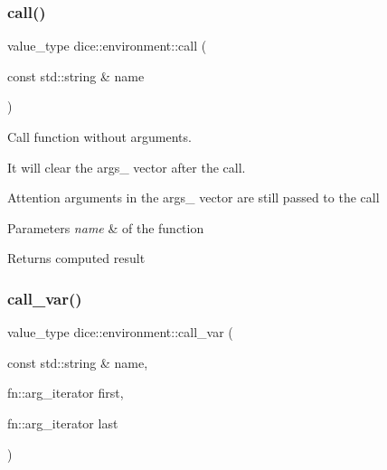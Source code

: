 \subsubsection{\texorpdfstring{call()}{call()}\hspace{0.1cm}{\footnotesize\ttfamily [2/2]}}
{\footnotesize\ttfamily value\+\_\+type dice\+::environment\+::call (\begin{DoxyParamCaption}\item[{const std\+::string \&}]{name }\end{DoxyParamCaption})\hspace{0.3cm}{\ttfamily [inline]}}



Call function without arguments. 

It will clear the args\+\_\+ vector after the call.

\begin{DoxyAttention}{Attention}
arguments in the args\+\_\+ vector are still passed to the call
\end{DoxyAttention}

\begin{DoxyParams}{Parameters}
{\em name} & of the function\\
\hline
\end{DoxyParams}
\begin{DoxyReturn}{Returns}
computed result 
\end{DoxyReturn}
\mbox{\label{classdice_1_1environment_a6736fed1b36c26714c20902dbe0d3bc0}} 
\subsubsection{\texorpdfstring{call\+\_\+var()}{call\_var()}}
{\footnotesize\ttfamily value\+\_\+type dice\+::environment\+::call\+\_\+var (\begin{DoxyParamCaption}\item[{const std\+::string \&}]{name,  }\item[{fn\+::arg\+\_\+iterator}]{first,  }\item[{fn\+::arg\+\_\+iterator}]{last }\end{DoxyParamCaption})\hspace{0.3cm}{\ttfamily [inline]}}



